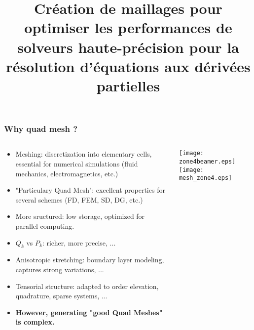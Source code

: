 \documentclass[compress,10pt,aspectratio=169]{beamer}
\title[]{Création de maillages pour optimiser les performances de solveurs haute-précision pour la résolution d'équations aux dérivées partielles\vspace{0.5cm}}
\date[]{}
\begin{document}
\MakeTitlePage




\begin{frame}
    \frametitle{Why quad mesh ?}
    \begin{columns}
        \begin{column}{0.8\textwidth}
        \vspace{-0.3cm}
            \begin{itemize}
            \item {\color{onera}Meshing:} discretization into elementary cells, essential for numerical simulations (fluid mechanics, electromagnetics, etc.)
            
            \item {\color{onera}"Particulary Quad Mesh":} excellent properties for several schemes (FD, FEM, SD, DG, etc.)
            
            \item {\color{onera}More sructured:} low storage, optimized for parallel computing.
            
            \item {\color{onera}$Q_k$ vs $P_k$:} richer, more precise, ...
            
            \item {\color{onera}Anisotropic stretching:} boundary layer modeling, captures strong variations, ...
            
            \item {\color{onera}Tensorial structure:} adapted to order elevation, quadrature, sparse systems, ...\vspace{0.2cm}
            
            \item 
            \textbf{However, generating "good Quad Meshes" is complex.}\vspace{0.25cm}
            \end{itemize}
        \end{column}
        \begin{column}{0.24\textwidth}
            \centering
            \texttt{[image: zone4beamer.eps]}
            \texttt{[image: mesh\_zone4.eps]}
        \end{column}
    \end{columns}
    \end{frame}
    
\end{document}
